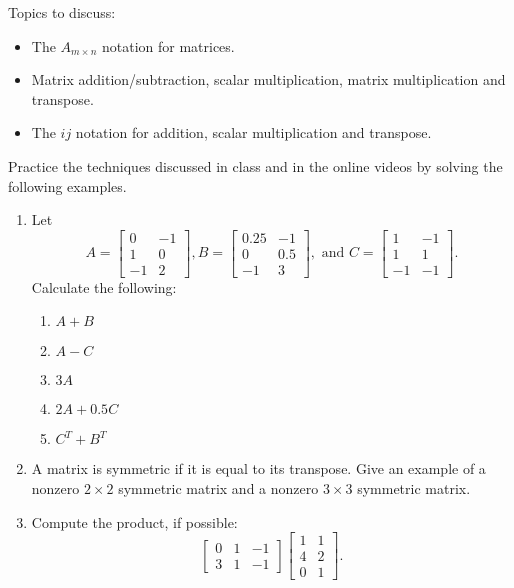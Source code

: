 \documentclass[10pt]{book}
\theoremstyle{definition}
\theoremstyle{remark}
\begin{document}
\begin{large}
\noindent
Topics to discuss:
\begin{itemize}
\item The $A_{m\times n}$ notation for matrices. 
\item Matrix addition/subtraction, scalar multiplication, matrix multiplication and transpose. 
\item The $ij$ notation for addition, scalar multiplication and transpose. 
\end{itemize}
\newpage

\noindent
Practice the techniques discussed in class and in the online videos by solving the following examples. 
\begin{enumerate}
\item Let \[A = \begin{bmatrix} 0 & -1 \\ 1 & 0 \\ -1 & 2 \end{bmatrix}, B = \begin{bmatrix} 0.25 & -1 \\ 0 & 0.5 \\ -1 & 3 \end{bmatrix}, \text{ and } C = \begin{bmatrix} 1 & -1 \\ 1 & 1 \\ -1 & -1 \end{bmatrix}.\]  Calculate the following:
\begin{enumerate}
	\item  $A + B$  \vfil
	\item  $A - C$  \vfil
	\item  $3A$  \vfil
	\item  $2A +0.5C$  \vfil
	\item  $C^T + B^T$  \vfil
\end{enumerate}
\newpage

\item A matrix is symmetric if it is equal to its transpose. Give an example of a nonzero $2 \times 2$ symmetric matrix and a nonzero $3 \times 3$ symmetric matrix.\vfil \vfil \vfil

\item Compute the product, if possible: \[ \begin{bmatrix} 0&1&-1 \\ 3 & 1 & -1 \end{bmatrix} \begin{bmatrix}1 & 1 \\ 4 & 2 \\ 0 & 1 \end{bmatrix}.\] \vfil \vfil \vfil
\newpage


\end{enumerate}
\end{large}
\end{document}
